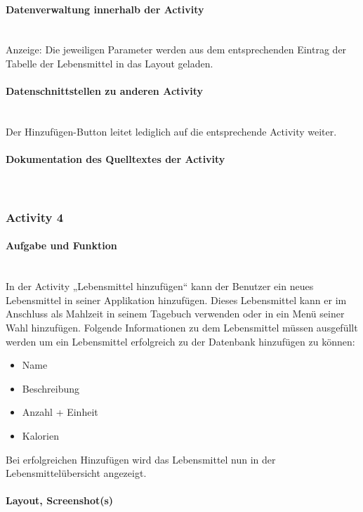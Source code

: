 \paragraph{Datenverwaltung innerhalb der Activity}\\
Anzeige: Die jeweiligen Parameter werden aus dem entsprechenden Eintrag der Tabelle der Lebensmittel in das Layout geladen. 

\paragraph{Datenschnittstellen zu anderen Activity}\\
Der Hinzufügen-Button leitet lediglich auf die entsprechende Activity weiter.

\paragraph{Dokumentation des Quelltextes der Activity}\\

\subsubsection{Activity 4}

\paragraph{Aufgabe und Funktion}\\
In der Activity „Lebensmittel hinzufügen“ kann der Benutzer ein neues Lebensmittel in seiner Applikation hinzufügen. Dieses Lebensmittel kann er im Anschluss als Mahlzeit in seinem Tagebuch verwenden oder in ein Menü seiner Wahl hinzufügen.
Folgende Informationen zu dem Lebensmittel müssen ausgefüllt werden um ein Lebensmittel erfolgreich zu der Datenbank hinzufügen zu können: 
\begin{itemize}
\item Name
\item Beschreibung
\item Anzahl + Einheit
\item Kalorien
\end{itemize}

Bei erfolgreichen Hinzufügen wird das Lebensmittel nun in der Lebensmittelübersicht angezeigt.

\paragraph{Layout, Screenshot(s)}\\

